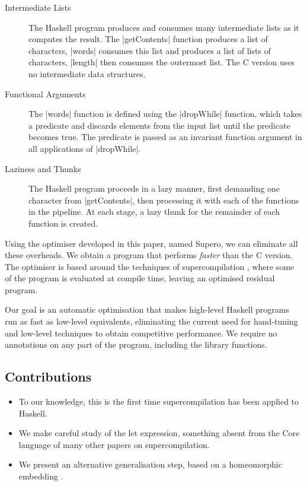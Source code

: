 \begin{description}
\item[Intermediate Lists] The Haskell program produces and consumes many intermediate lists as it computes the result. The |getContents| function produces a list of characters, |words| consumes this list and produces a list of lists of characters, |length| then consumes the outermost list. The C version uses no intermediate data structures.
\item[Functional Arguments] The |words| function is defined using the |dropWhile| function, which takes a predicate and discards elements from the input list until the predicate becomes true. The predicate is passed as an invariant function argument in all applications of |dropWhile|.
\item[Laziness and Thunks] The Haskell program proceeds in a lazy manner, first demanding one character from |getContents|, then processing it with each of the functions in the pipeline. At each stage, a lazy thunk for the remainder of each function is created.
\end{description}

Using the optimiser developed in this paper, named Supero, we can eliminate all these overheads. We obtain a program that performs \textit{faster} than the C version. The optimiser is based around the techniques of supercompilation \cite{supercompilation}, where some of the program is evaluated at compile time, leaving an optimised residual program.

Our goal is an automatic optimisation that makes high-level Haskell programs run as fast as low-level equivalents, eliminating the current need for hand-tuning and low-level techniques to obtain competitive performance. We require no annotations on any part of the program, including the library functions.

\subsection{Contributions}

\begin{itemize}
\item To our knowledge, this is the first time supercompilation has been applied to Haskell. \item We make careful study of the let expression, something absent from the Core language of many other papers on supercompilation.
\item We present an alternative generalisation step, based on a homeomorphic embedding \cite{leuschel:homeomorphic}.
\end{itemize}

